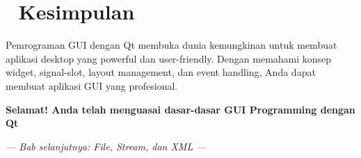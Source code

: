 \section{🎉 Kesimpulan}

Pemrograman GUI dengan Qt membuka dunia kemungkinan untuk membuat aplikasi desktop yang powerful dan user-friendly. Dengan memahami konsep widget, signal-slot, layout management, dan event handling, Anda dapat membuat aplikasi GUI yang profesional.

\begin{center}
\textbf{Selamat! Anda telah menguasai dasar-dasar GUI Programming dengan Qt} 🎨
\end{center}

\vspace{1cm}

\begin{center}
\textit{--- Bab selanjutnya: File, Stream, dan XML ---}
\end{center}

